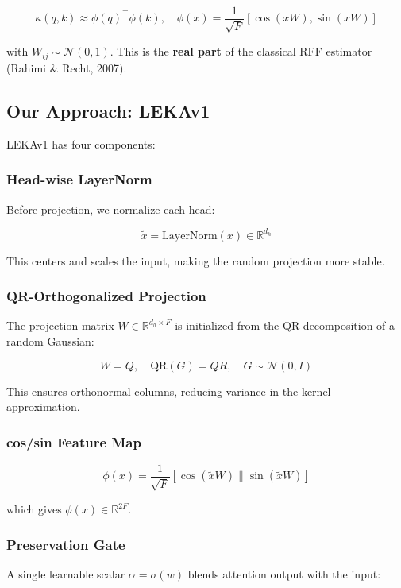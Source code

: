 \[
\kappa(q, k) \approx \phi(q)^\top \phi(k), \quad
\phi(x) = \frac{1}{\sqrt{F}} \left[ \cos(x W), \sin(x W) \right]
\tag{1.4}
\]

with $W_{ij} \sim \mathcal{N}(0, 1)$. This is the \textbf{real part} of the 
classical RFF estimator (Rahimi \& Recht, 2007).

\subsection{Our Approach: LEKAv1}

LEKAv1 has four components:

\subsubsection{Head-wise LayerNorm}

Before projection, we normalize each head:

\[
\tilde{x} = \text{LayerNorm}(x) \in \mathbb{R}^{d_h}
\tag{1.5}
\]

This centers and scales the input, making the random projection more 
stable.

\subsubsection{QR-Orthogonalized Projection}

The projection matrix $W \in \mathbb{R}^{d_h \times F}$ is initialized from 
the QR decomposition of a random Gaussian:

\[
W = Q, \quad \text{QR}(G) = QR, \quad G \sim \mathcal{N}(0, I)
\tag{1.6}
\]

This ensures orthonormal columns, reducing variance in the kernel 
approximation.

\subsubsection{cos/sin Feature Map}

\[
\phi(x) = \frac{1}{\sqrt{F}} [\cos(\tilde{x} W) \| \sin(\tilde{x} W)]
\tag{1.7}
\]

which gives $\phi(x) \in \mathbb{R}^{2F}$.

\subsubsection{Preservation Gate}

A single learnable scalar $\alpha = \sigma(w)$ blends attention output 
with the input:

